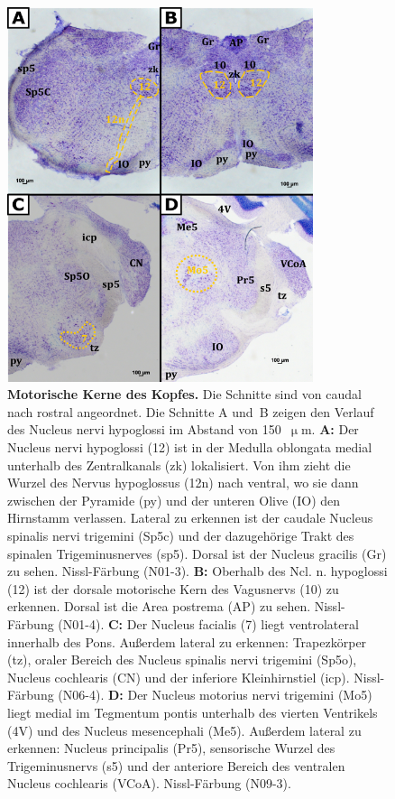 \begin{figure}[H]
    \centering
    \includegraphics[width=0.8\textwidth]{pictures/Bilder_Laura/Kerne_motorik_kopf_N01_3_N01_4_N06_4_N09_3.png}
    \caption[Motorische Kerne des Kopfes]{\textbf{Motorische Kerne des Kopfes.} Die Schnitte sind von caudal nach rostral angeordnet. Die Schnitte A und~B zeigen den Verlauf des Nucleus nervi hypoglossi im Abstand von 150~$\upmu$m. \textbf{A:} Der Nucleus nervi hypoglossi (12) ist in der Medulla oblongata medial unterhalb des Zentralkanals (zk) lokalisiert. Von ihm zieht die Wurzel des Nervus hypoglossus (12n) nach ventral, wo sie dann zwischen der Pyramide (py) und der unteren Olive (IO) den Hirnstamm verlassen. Lateral zu erkennen ist der caudale Nucleus spinalis nervi trigemini (Sp5c) und der dazugehörige Trakt des spinalen Trigeminusnerves (sp5). Dorsal ist der Nucleus gracilis (Gr) zu sehen. Nissl-Färbung (N01-3). \textbf{B:} Oberhalb des Ncl. n. hypoglossi (12) ist der dorsale motorische Kern des Vagusnervs (10) zu erkennen. Dorsal ist die Area postrema (AP) zu sehen. Nissl-Färbung (N01-4). \textbf{C:} Der Nucleus facialis (7) liegt ventrolateral innerhalb des Pons. Außerdem lateral zu erkennen: Trapezkörper (tz), oraler Bereich des Nucleus spinalis nervi trigemini (Sp5o), Nucleus cochlearis (CN) und der inferiore Kleinhirnstiel (icp). Nissl-Färbung (N06-4). \textbf{D:} Der Nucleus motorius nervi trigemini (Mo5) liegt medial im Tegmentum pontis unterhalb des vierten Ventrikels (4V) und des Nucleus mesencephali (Me5). Außerdem lateral zu erkennen: Nucleus principalis (Pr5), sensorische Wurzel des Trigeminusnervs (s5) und der anteriore Bereich des ventralen Nucleus cochlearis (VCoA). Nissl-Färbung (N09-3).}
    \label{fig:kerne_kopfmotorik}
\end{figure}